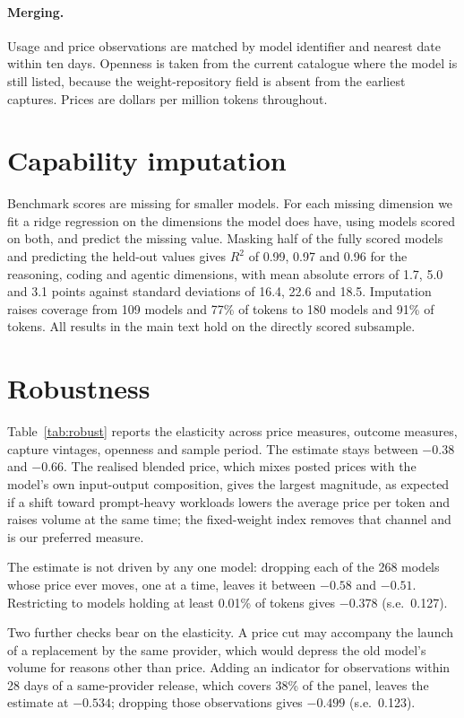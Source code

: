\documentclass{article}
\newcommand{\Nscored}{180}
\newcommand{\CovScored}{91}
\begin{document}
\paragraph{Merging.} Usage and price observations are matched by model identifier and
nearest date within ten days. Openness is taken from the current catalogue where the model
is still listed, because the weight-repository field is absent from the earliest captures.
Prices are dollars per million tokens throughout.

\section{Capability imputation}

Benchmark scores are missing for smaller models. For each missing dimension we fit a ridge
regression on the dimensions the model does have, using models scored on both, and predict
the missing value. Masking half of the fully scored models and predicting the held-out
values gives $R^2$ of 0.99, 0.97 and 0.96 for the reasoning, coding and agentic dimensions,
with mean absolute errors of 1.7, 5.0 and 3.1 points against standard deviations of 16.4,
22.6 and 18.5. Imputation raises coverage from 109 models and 77\% of tokens to \Nscored{}
models and \CovScored\% of tokens. All results in the main text hold on the directly scored
subsample.

\section{Robustness}

Table~\ref{tab:robust} reports the elasticity across price measures, outcome measures,
capture vintages, openness and sample period. The estimate stays between $-0.38$ and
$-0.66$. The realised blended price, which mixes posted prices with the model's own
input-output composition, gives the largest magnitude, as expected if a shift toward
prompt-heavy workloads lowers the average price per token and raises volume at the same
time; the fixed-weight index removes that channel and is our preferred measure.

The estimate is not driven by any one model: dropping each of the 268 models whose price
ever moves, one at a time, leaves it between $-0.58$ and $-0.51$. Restricting to models
holding at least 0.01\% of tokens gives $-0.378$ (s.e.\ 0.127).

Two further checks bear on the elasticity. A price cut may accompany the launch of a
replacement by the same provider, which would depress the old model's volume for reasons
other than price. Adding an indicator for observations within 28 days of a same-provider
release, which covers 38\% of the panel, leaves the estimate at $-0.534$; dropping those
observations gives $-0.499$ (s.e.\ 0.123).
\end{document}
